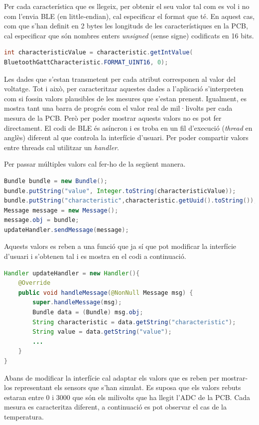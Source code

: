 Per cada característica que es llegeix, per obtenir el seu valor tal com es vol i no com l'envia BLE (en little-endian), cal especificar el format que té.
En aquest cas, com que s'han definit en 2 bytes les longituds de les característiques en la PCB, cal especificar que són nombres enters \textit{unsigned} (sense signe) codificats en 16 bits.

\begin{lstlisting}[language=java]
int characteristicValue = characteristic.getIntValue(
BluetoothGattCharacteristic.FORMAT_UINT16, 0);
\end{lstlisting}

Les dades que s'estan transmetent per cada atribut corresponen al valor del voltatge.
Tot i això, per caracteritzar aquestes dades a l'aplicació s'interpreten com si fossin valors plausibles de les mesures que s'estan prenent.
Igualment, es mostra tant una barra de progrés com el valor real de mil·livolts per cada mesura de la PCB.
Però per poder mostrar aquests valors no es pot fer directament.
El codi de BLE és asíncron i es troba en un fil d'execució (\textit{thread} en anglès) diferent al que controla la interfície d'usuari.
Per poder compartir valors entre threads cal utilitzar un \textit{handler}.

Per passar múltiples valors cal fer-ho de la següent manera.
\begin{lstlisting}[language=java]
Bundle bundle = new Bundle();
bundle.putString("value", Integer.toString(characteristicValue));
bundle.putString("characteristic",characteristic.getUuid().toString());
Message message = new Message();
message.obj = bundle;
updateHandler.sendMessage(message);
\end{lstlisting}

Aquests valors es reben a una funció que ja sí que pot modificar la interfície d'usuari i s'obtenen tal i es mostra en el codi a continuació.

\begin{lstlisting}[language=java]
 Handler updateHandler = new Handler(){
	@Override
	public void handleMessage(@NonNull Message msg) {
		super.handleMessage(msg);
		Bundle data = (Bundle) msg.obj;
		String characteristic = data.getString("characteristic");
		String value = data.getString("value");
		...
	}
}
\end{lstlisting}

Abans de modificar la interfície cal adaptar els valors que es reben per mostrar-los representant els sensors que s'han simulat.
Es suposa que els valors rebuts estaran entre 0 i 3000 que són els milivolts que ha llegit l'ADC de la PCB.
Cada mesura es caracteritza diferent, a continuació es pot observar el cas de la temperatura.

